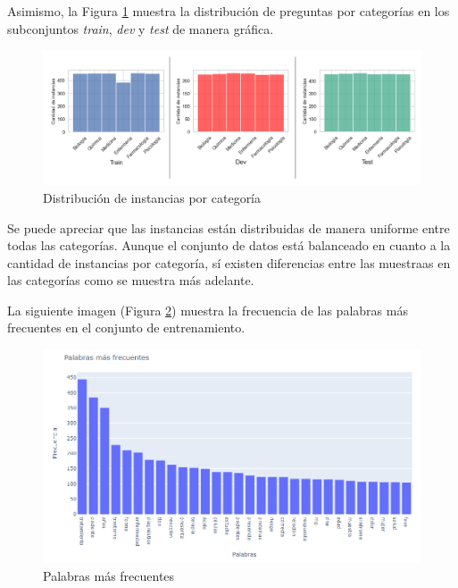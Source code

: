 Asimismo, la Figura \ref{train_dev_test} muestra la distribución de preguntas por categorías en los subconjuntos \textit{train}, \textit{dev} y \textit{test} de manera gráfica.

\begin{figure}[!tb]
  \begin{center}
    \includegraphics[angle=0, width=1\textwidth]{Graphics/train_dev_test.png}
  \end{center}
    \caption{Distribución de instancias por categoría}\label{train_dev_test}
\end{figure}

Se puede apreciar que las instancias están distribuidas de manera uniforme entre todas las categorías. Aunque el conjunto de datos está balanceado en cuanto a la cantidad de instancias por categoría, sí existen diferencias entre las muestraas en las categorías como se muestra más adelante.

La siguiente imagen (Figura \ref{words}) muestra la frecuencia de las palabras más frecuentes en el conjunto de entrenamiento.

\begin{figure}[!tb]
  \begin{center}
    \includegraphics[angle=0, width=1\textwidth]{Graphics/words.png}
  \end{center}
    \caption{Palabras más frecuentes}\label{words}
\end{figure}



